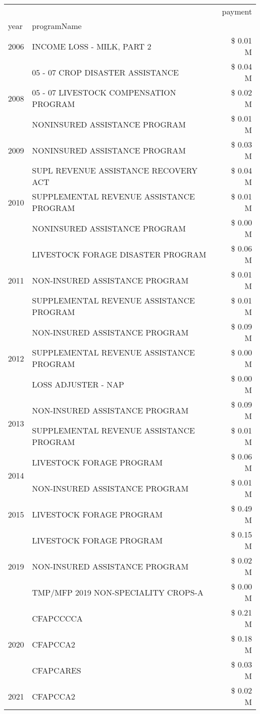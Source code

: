 \begin{tabular}{llr}
\toprule
 &  & payment \\
year & programName &  \\
\midrule
2006 & INCOME LOSS - MILK, PART 2 & \$ 0.01 M \\
\cline{1-3}
\multirow[t]{3}{*}{2008} & 05 - 07 CROP DISASTER ASSISTANCE & \$ 0.04 M \\
 & 05 - 07 LIVESTOCK COMPENSATION PROGRAM & \$ 0.02 M \\
 & NONINSURED ASSISTANCE PROGRAM & \$ 0.01 M \\
\cline{1-3}
2009 & NONINSURED ASSISTANCE PROGRAM & \$ 0.03 M \\
\cline{1-3}
\multirow[t]{3}{*}{2010} & SUPL REVENUE ASSISTANCE RECOVERY ACT & \$ 0.04 M \\
 & SUPPLEMENTAL REVENUE ASSISTANCE PROGRAM & \$ 0.01 M \\
 & NONINSURED ASSISTANCE PROGRAM & \$ 0.00 M \\
\cline{1-3}
\multirow[t]{3}{*}{2011} & LIVESTOCK FORAGE DISASTER PROGRAM & \$ 0.06 M \\
 & NON-INSURED ASSISTANCE PROGRAM & \$ 0.01 M \\
 & SUPPLEMENTAL REVENUE ASSISTANCE PROGRAM & \$ 0.01 M \\
\cline{1-3}
\multirow[t]{3}{*}{2012} & NON-INSURED ASSISTANCE PROGRAM & \$ 0.09 M \\
 & SUPPLEMENTAL REVENUE ASSISTANCE PROGRAM & \$ 0.00 M \\
 & LOSS ADJUSTER - NAP & \$ 0.00 M \\
\cline{1-3}
\multirow[t]{2}{*}{2013} & NON-INSURED ASSISTANCE PROGRAM & \$ 0.09 M \\
 & SUPPLEMENTAL REVENUE ASSISTANCE PROGRAM & \$ 0.01 M \\
\cline{1-3}
\multirow[t]{2}{*}{2014} & LIVESTOCK FORAGE PROGRAM & \$ 0.06 M \\
 & NON-INSURED ASSISTANCE PROGRAM & \$ 0.01 M \\
\cline{1-3}
2015 & LIVESTOCK FORAGE PROGRAM & \$ 0.49 M \\
\cline{1-3}
\multirow[t]{3}{*}{2019} & LIVESTOCK FORAGE PROGRAM & \$ 0.15 M \\
 & NON-INSURED ASSISTANCE PROGRAM & \$ 0.02 M \\
 & TMP/MFP 2019 NON-SPECIALITY CROPS-A & \$ 0.00 M \\
\cline{1-3}
\multirow[t]{3}{*}{2020} & CFAPCCCCA & \$ 0.21 M \\
 & CFAPCCA2 & \$ 0.18 M \\
 & CFAPCARES & \$ 0.03 M \\
\cline{1-3}
2021 & CFAPCCA2 & \$ 0.02 M \\
\cline{1-3}
\bottomrule
\end{tabular}
